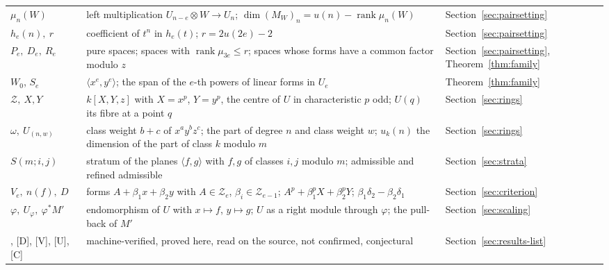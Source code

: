 \begin{tabular}{@{}>{\raggedright\arraybackslash}p{2.7cm}>{\raggedright\arraybackslash}p{9.2cm}l@{}}
$\mu_n(W)$ & left multiplication $U_{n-e}\otimes W\to U_n$; $\dim(M_W)_n=u(n)-\operatorname{rank}\mu_n(W)$ & Section~\ref{sec:pairsetting}\\
$h_e(n),\ r$ & coefficient of $t^n$ in $h_e(t)$; $r=2u(2e)-2$ & Section~\ref{sec:pairsetting}\\
$P_e,\ D_e,\ R_e$ & pure spaces; spaces with $\operatorname{rank}\mu_{3e}\le r$; spaces whose forms have a common factor modulo $z$ & Section~\ref{sec:pairsetting}, Theorem~\ref{thm:family}\\
$W_0$, $S_e$ & $\langle x^e,y^e\rangle$; the span of the $e$-th powers of linear forms in $U_e$ & Theorem~\ref{thm:family}\\
$\mathcal Z,\ X,Y$ & $k[X,Y,z]$ with $X=x^p$, $Y=y^p$, the centre of $U$ in characteristic $p$ odd; $U(q)$ its fibre at a point $q$ & Section~\ref{sec:rings}\\
$\omega,\ U_{(n,w)}$ & class weight $b+c$ of $x^ay^bz^c$; the part of degree $n$ and class weight $w$; $u_k(n)$ the dimension of the part of class $k$ modulo $m$ & Section~\ref{sec:rings}\\
$S(m;i,j)$ & stratum of the planes $\langle f,g\rangle$ with $f,g$ of classes $i,j$ modulo $m$; admissible and refined admissible & Section~\ref{sec:strata}\\
$V_e,\ n(f),\ D$ & forms $A+\beta_1x+\beta_2y$ with $A\in\mathcal Z_e$, $\beta_i\in\mathcal Z_{e-1}$; $A^p+\beta_1^pX+\beta_2^pY$; $\beta_1\delta_2-\beta_2\delta_1$ & Section~\ref{sec:criterion}\\
$\varphi,\ U_\varphi,\ \varphi^*M'$ & endomorphism of $U$ with $x\mapsto f$, $y\mapsto g$; $U$ as a right module through $\varphi$; the pull-back of $M'$ & Section~\ref{sec:scaling}\\
{[MV]}, {[D]}, {[V]}, {[U]}, {[C]} & machine-verified, proved here, read on the source, not confirmed, conjectural & Section~\ref{sec:results-list}\\
\bottomrule
\end{tabular}
